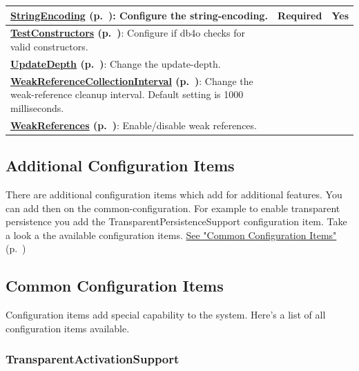 {\begin{longtable}{|p{}|p{}|p{}|}
\textbf{\hyperref[ref:configuration-common-string-encoding]{StringEncoding} (p.~\pageref{ref:configuration-common-string-encoding})}: Configure the string-encoding. & Required & Yes \\ \hline
\textbf{\hyperref[ref:configuration-common-no-test-instances]{TestConstructors} (p.~\pageref{ref:configuration-common-no-test-instances})}: Configure if db4o checks for valid constructors. &  &  \\ \hline
\textbf{\hyperref[ref:configuration-common-update-depth]{UpdateDepth} (p.~\pageref{ref:configuration-common-update-depth})}: Change the update-depth. &  &  \\ \hline
\textbf{\hyperref[ref:configuration-common-weak-reference-collection-interval]{WeakReferenceCollectionInterval} (p.~\pageref{ref:configuration-common-weak-reference-collection-interval})}: Change the weak-reference cleanup interval. Default setting is 1000 milliseconds. &  &  \\ \hline
\textbf{\hyperref[ref:configuration-common-disable-weak-references]{WeakReferences} (p.~\pageref{ref:configuration-common-disable-weak-references})}: Enable/disable weak references. &  &  \\ \hline
\end{longtable}}

\subsection*{Additional Configuration Items}

There are additional configuration items which add for additional features. You can add then on the common-configuration. For example to enable transparent persistence you add the TransparentPersistenceSupport configuration item. Take a look a the available configuration items. \hyperref[ref:configuration-common-configuration-items]{See "Common Configuration Items"} (p.~\pageref{ref:configuration-common-configuration-items})

\subsection{Common Configuration Items}
\label{ref:configuration-common-configuration-items}

Configuration items add special capability to the system. Here's a list of all configuration items available.

\subsubsection*{TransparentActivationSupport}

